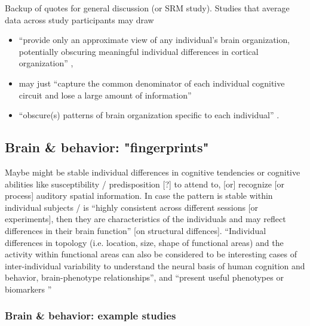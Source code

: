 Backup of quotes for general discussion (or SRM study).  Studies that average
data across study participants may draw

\begin{itemize}

\item ``provide only an approximate view of any individual's brain organization,
    potentially obscuring meaningful individual differences in cortical
        organization'' \citep{laumann2015functional},

\item may just ``capture the common denominator of each individual cognitive
    circuit and lose a large amount of information''

\item ``obscure(s) patterns of brain organization specific to each individual''
    \citep{laumann2015functional}.

\end{itemize}


\subsection{Brain \& behavior: "fingerprints"}

%
Maybe might be stable individual differences in cognitive tendencies or
cognitive abilities like susceptibility / predisposition [?] to attend to, [or]
recognize [or process] auditory spatial information.
In case the pattern is stable within individual subjects / is ``highly
consistent across different sessions [or experiments], then they are
characteristics of the individuals and may reflect differences in their brain
function'' \citep{kanai2011structural} [on structural diffences].
%
``Individual differences in topology (i.e. location, size, shape of functional
areas) and the activity within functional areas can also be considered to be
interesting cases of inter-individual variability to understand the neural basis
of human cognition and behavior, brain-phenotype relationships'', and ``present
useful phenotypes or biomarkers \citep{glasser2016multi,
vanhorn2008individual}''


\subsubsection{Brain \& behavior: example studies}


